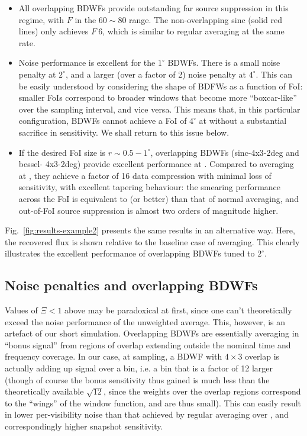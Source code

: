 \documentclass[useAMS,usenatbib]{mn2e}
\begin{document}
\begin{itemize}

\item All overlapping BDWFs provide outstanding far source suppression in this regime, with $F$ in the $60\sim80$ range. 
The non-overlapping sinc (solid red lines) only achieves $F~6$, which is similar to regular averaging
at the same rate. 

\item Noise performance is excellent for the $1^\circ$ BDWFs. There is a small noise penalty at $2^\circ$, and a larger 
(over a factor of 2) noise penalty at $4^\circ$. This can be easily understood by considering the shape of BDFWs as
a function of FoI: smaller FoIs correspond to broader windows that become more ``boxcar-like'' over the sampling
interval, and vice versa. This means that, in this particular configuration, BDWFs cannot achieve a FoI of $4^\circ$
at  without a substantial sacrifice in sensitivity. We shall return to this issue below.

\item If the desired FoI size is $r\sim0.5-1^\circ$, overlapping BDWFs (sinc-4x3-2deg and bessel-
4x3-2deg) provide excellent performance at . Compared to averaging at , they achieve a factor
of 16 data compression with minimal loss of sensitivity, with excellent tapering behaviour: the smearing performance 
across the FoI is equivalent to (or better) than that of normal averaging, and out-of-FoI source suppression is almost
two orders of magnitude higher.

\end{itemize}

Fig.~\ref{fig:results-example2} presents the same results in an alternative way. Here, the recovered flux is shown 
relative to the baseline case of  averaging. This clearly illustrates the excellent performance of overlapping
BDWFs tuned to $2^\circ$.

\subsection{Noise penalties and overlapping BDWFs}

Values of $\Xi<1$ above may be paradoxical at first, since one can't theoretically exceed the noise performance of the
unweighted average. This, however, is an artefact of our short simulation. Overlapping BDWFs are essentially
averaging in ``bonus signal'' from regions of overlap extending outside the nominal time and frequency 
coverage. In our case, at  sampling, a BDWF with $4\times3$ overlap is actually adding up signal over a
 bin, i.e. a bin that is a factor of 12 larger (though of course the bonus sensitivity thus gained is much
less than the theoretically available $\sqrt{12}$, since the weights over the overlap regions correspond
to the ``wings'' of the window function, and are thus small). This can easily result in lower per-visibility noise than that 
achieved by regular averaging over , and correspondingly higher snapshot sensitivity.
\end{document}
